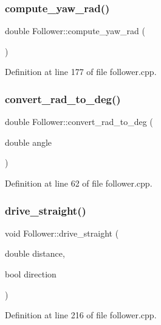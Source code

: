 \subsubsection{\texorpdfstring{compute\+\_\+yaw\+\_\+rad()}{compute\_yaw\_rad()}}
{\footnotesize\ttfamily double Follower\+::compute\+\_\+yaw\+\_\+rad (\begin{DoxyParamCaption}{ }\end{DoxyParamCaption})}



Definition at line 177 of file follower.\+cpp.

\mbox{\label{class_follower_a670f07466502e1020514d6ba6b928553}} 
\subsubsection{\texorpdfstring{convert\+\_\+rad\+\_\+to\+\_\+deg()}{convert\_rad\_to\_deg()}}
{\footnotesize\ttfamily double Follower\+::convert\+\_\+rad\+\_\+to\+\_\+deg (\begin{DoxyParamCaption}\item[{double}]{angle }\end{DoxyParamCaption})}



Definition at line 62 of file follower.\+cpp.

\mbox{\label{class_follower_ad4d1ce6f43ce65c0aa5a560247ca55ad}} 
\subsubsection{\texorpdfstring{drive\+\_\+straight()}{drive\_straight()}}
{\footnotesize\ttfamily void Follower\+::drive\+\_\+straight (\begin{DoxyParamCaption}\item[{double}]{distance,  }\item[{bool}]{direction }\end{DoxyParamCaption})}



Definition at line 216 of file follower.\+cpp.

